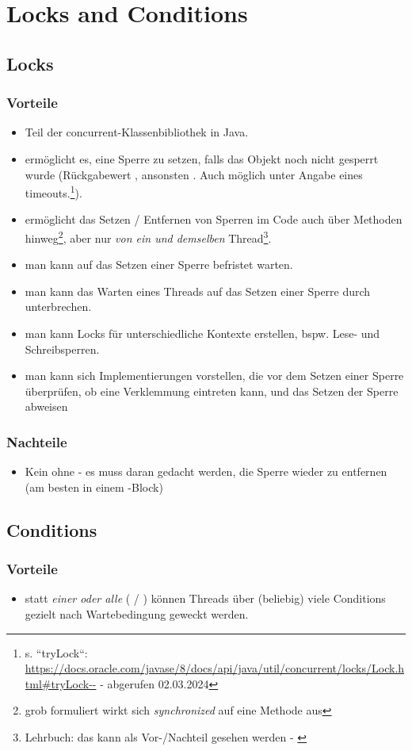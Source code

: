 \section{Locks and Conditions}

\subsection{Locks}

\subsubsection*{Vorteile}

\begin{itemize}
    \item Teil der concurrent-Klassenbibliothek in Java.
    \item {} ermöglicht es, eine Sperre zu setzen, falls das Objekt noch nicht gesperrt wurde (Rückgabewert , ansonsten .
    Auch möglich unter Angabe eines timeouts.\footnote{
s. ``tryLock``: \url{https://docs.oracle.com/javase/8/docs/api/java/util/concurrent/locks/Lock.html#tryLock--} - abgerufen 02.03.2024
    }).
    \item ermöglicht das Setzen  / Entfernen  von Sperren im Code auch über Methoden hinweg\footnote{
        grob formuliert wirkt sich \textit{synchronized} auf eine Methode aus
    }, aber nur \textit{von ein und demselben} Thread\footnote{Lehrbuch: das kann als Vor-/Nachteil gesehen werden - \cite[149]{Oec22}}.
    \item man kann auf das Setzen einer Sperre befristet warten.
    \item man kann das Warten eines Threads auf das Setzen einer Sperre durch  unterbrechen.
    \item man kann Locks für unterschiedliche Kontexte erstellen, bspw. Lese- und Schreibsperren.
    \item man kann sich Implementierungen vorstellen, die vor dem Setzen einer Sperre überprüfen, ob eine Verklemmung eintreten kann, und das Setzen der Sperre abweisen
\end{itemize}


\subsubsection*{Nachteile}
\begin{itemize}
    \item Kein  ohne  - es muss daran gedacht werden, die Sperre wieder zu entfernen (am besten in einem -Block)
\end{itemize}

\subsection{Conditions}

\subsubsection*{Vorteile}

\begin{itemize}
    \item statt \textit{einer oder alle} ( / ) können Threads über (beliebig) viele Conditions gezielt nach Wartebedingung geweckt werden.
\end{itemize}
